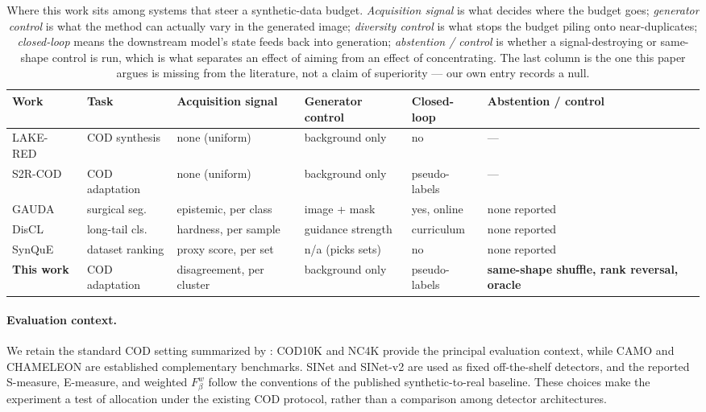 \documentclass{article} %
\begin{document}
\begin{table}[t]
\caption{Where this work sits among systems that steer a synthetic-data budget. \emph{Acquisition
signal} is what decides where the budget goes; \emph{generator control} is what the method can
actually vary in the generated image; \emph{diversity control} is what stops the budget piling onto
near-duplicates; \emph{closed-loop} means the downstream model's state feeds back into generation;
\emph{abstention / control} is whether a signal-destroying or same-shape control is run, which is
what separates an effect of aiming from an effect of concentrating. The last column is the one this
paper argues is missing from the literature, not a claim of superiority --- our own entry records a
null.}
\label{tab:closest}
\begin{center}
\small
\setlength{\tabcolsep}{3pt}
\footnotesize
\begin{tabular}{@{}lp{1.75cm}p{1.9cm}p{1.75cm}p{1.35cm}p{1.9cm}@{}}
\toprule
Work & Task & Acquisition signal & Generator control & Closed-loop & Abstention / control \\
\midrule
LAKE-RED~\cite{zhao2024lakered} & COD synthesis & none (uniform) & background only & no & --- \\
S2R-COD~\cite{luo2025s2rcod} & COD adaptation & none (uniform) & background only & pseudo-labels & --- \\
GAUDA~\cite{frisch2025gauda} & surgical seg. & epistemic, per class & image + mask & yes, online & none reported \\
DisCL~\cite{liang2025discl} & long-tail cls. & hardness, per sample & guidance strength & curriculum & none reported \\
SynQuE~\cite{chen2025synque} & dataset ranking & proxy score, per set & n/a (picks sets) & no & none reported \\
\midrule
\textbf{This work} & COD adaptation & disagreement, per cluster & background only & pseudo-labels &
\textbf{same-shape shuffle, rank reversal, oracle} \\
\bottomrule
\end{tabular}
\end{center}
\end{table}

\paragraph{Evaluation context.}
We retain the standard COD setting summarized by \citet{fan2023advances}: COD10K and NC4K provide
the principal evaluation context, while CAMO and CHAMELEON are established complementary
benchmarks. SINet and SINet-v2 are used as fixed off-the-shelf detectors, and the reported
S-measure, E-measure, and weighted $F_\beta^w$ follow the conventions of the published synthetic-to-real
baseline. These choices make the experiment a test of allocation under the existing COD protocol,
rather than a comparison among detector architectures.
\end{document}
